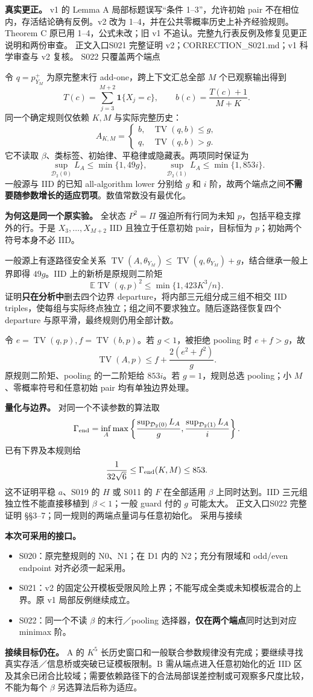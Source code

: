 \documentclass[11pt,a4paper]{article}
\newcommand{\TV}{\operatorname{TV}}\newcommand{\E}{\mathbb E}\newcommand{\R}{R_{\mathrm{D2}}}\newcommand{\Rp}{R_{\mathrm{D2}}^+}
\newcommand{\head}[2]{{\small\sffamily #1}\par\vspace{2pt}{\LARGE\bfseries #2}\par\vspace{5pt}}
\newcommand{\entry}[1]{\vfill\noindent\small 正文入口\quad #1\normalsize}
\begin{document}
\textbf{真实更正。} v1 的 Lemma A 局部标题误写“条件 1--3”，允许初始 pair 不在相位内，存活结论确有反例。v2 改为 1--4，并在公共零概率历史上补齐经验规则。Theorem C 原已用 1--4，公式未改；旧 v1 不追认。完整九行表反例及修复见更正说明和两份审查。
\entry{S021 完整证明 v2；CORRECTION\_S021.md；v1 科学审查与 v2 复核。}
\newpage
\head{S022 只覆盖两个端点}{同一个规则不知道 beta 也能选择}
令 $q=p^+_{Y_M}$ 为原完整末行 add-one，跨上下文汇总全部 $M$ 个已观察输出得到
\[
T(c)=\sum_{j=3}^{M+2}\mathbf1\{X_j=c\},\qquad b(c)=\frac{T(c)+1}{M+K}.
\]
同一个确定规则仅依赖 $K,M$ 与实际完整历史：
\[
\boxed{A_{K,M}=\begin{cases}b,&\TV(q,b)\le g,\\q,&\TV(q,b)>g.\end{cases}}
\]
它不读取 $\beta$、类标签、初始律、平稳律或隐藏表。两项同时保证为
\[
\sup_{\mathcal D_2(0)}L_A\le\min\{1,49g\},\qquad
\sup_{\mathcal D_2(1)}L_A\le\min\{1,853i\}.
\]
一般源与 IID 的已知 all-algorithm lower 分别给 $g$ 和 $i$ 阶，故两个端点之间\textbf{不需要随参数增长的适应罚项}。数值常数没有最优化。

\textbf{为何这是同一个原实验。} 全状态 $P^2=\Pi$ 强迫所有行同为未知 $p$，包括平稳支撑外的行。于是 $X_3,\ldots,X_{M+2}$ IID 且独立于任意初始 pair，目标恒为 $p$；初始两个符号本身不必 IID。

一般源上有逐路径安全关系 $\TV(A,\theta_{Y_M})\le\TV(q,\theta_{Y_M})+g$，结合继承一般上界即得 $49g$。IID 上的新桥是原规则二阶矩
\[
\E\TV(q,p)^2\le\min\{1,423K^3/n\}.
\]
证明\textbf{只在分析中}删去四个边界 departure，将内部三元组分成三组不相交 IID triples，使每组与实际终点独立；组之间不要求独立。随后逐路径恢复四个 departure 与原平滑，最终规则仍用全部计数。

令 $e=\TV(q,p),f=\TV(b,p)$。若 $g<1$，被拒绝 pooling 时 $e+f>g$，故
\[
\TV(A,p)\le f+\frac{2(e^2+f^2)}g.
\]
原规则二阶矩、pooling 的一二阶矩给 $853i$。若 $g=1$，规则总选 pooling；小 $M$、零概率符号和任意初始 pair 均有单独边界处理。

\textbf{量化与边界。} 对同一个不读参数的算法取
\[
\Gamma_{\rm end}=\inf_A\max\left\{\frac{\sup_{\mathcal D_2(0)}L_A}{g},\frac{\sup_{\mathcal D_2(1)}L_A}{i}\right\}.
\]
已有下界及本规则给
\[
\frac1{32\sqrt6}\le\Gamma_{\rm end}(K,M)\le853.
\]
这不证明平稳 $a$、S019 的 $H$ 或 S011 的 $F$ 在全部适用 $\beta$ 上同时达到。IID 三元组独立性不能直接移植到 $\beta<1$；一般 guard 付的 $g$ 可能太大。
\entry{S022 完整证明 §§3--7；同一规则的两端点量词与任意初始化。}
\newpage
\head{采用与接续}{阶段包是接口不是研究终点}
\textbf{本次可采用的接口。}
\begin{itemize}
\item S020：原完整规则的 N0、N1；在 D1 内的 N2；充分有限域和 odd/even endpoint 对齐必须一起采用。
\item S021：v2 的固定公开模板受限风险上界；不能写成全类或未知模板混合的上界。原 v1 局部反例继续成立。
\item S022：同一个不读 $\beta$ 的末行／pooling 选择器，\textbf{仅在两个端点}同时达到对应 minimax 阶。
\end{itemize}
\textbf{接续目标仍在。} A 的 $K^5$ 长历史窗口和一般联合参数规律没有完成；要继续寻找真实存活／信息桥或突破已证模板限制。B 需从端点进入任意初始化的近 IID 区及其余已闭合比较域；需要依赖路径下的合法局部误差控制或可观察多尺度比较，不能为每个 $\beta$ 另选算法后称为适应。
\end{document}
